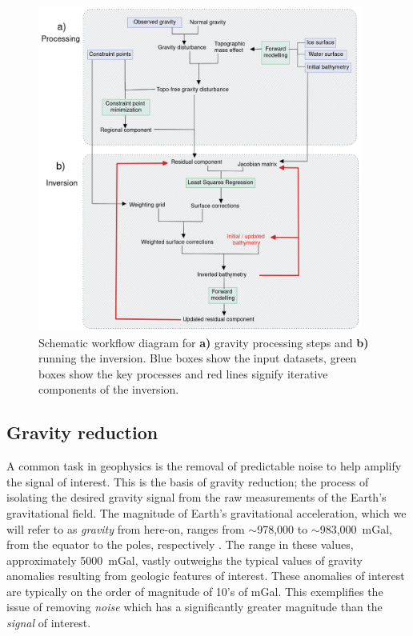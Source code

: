 \begin{figure}[!ht]
    \centering
    \includegraphics[width=0.95\textwidth]{figures/chp4/Inversion_workflow.png}
    \caption[Schematic inversion workflow diagram]{Schematic workflow diagram for \textbf{a)} gravity processing steps and \textbf{b)} running the inversion. Blue boxes show the input datasets, green boxes show the key processes and red lines signify iterative components of the inversion.}
    \label{fig:chp4_workflow}
\end{figure}

\subsection{Gravity reduction} \label{chp4:gravity_reduction}

A common task in geophysics is the removal of predictable noise to help amplify the signal of interest. This is the basis of gravity reduction; the process of isolating the desired gravity signal from the raw measurements of the Earth's gravitational field. The magnitude of Earth's gravitational acceleration, which we will refer to as \textit{gravity} from here-on, ranges from $\sim$978,000 to $\sim$983,000~mGal, from the equator to the poles, respectively \citep{hofmann-wellenhofphysical2006}. The range in these values, approximately 5000~mGal, vastly outweighs the typical values of gravity anomalies resulting from geologic features of interest. These anomalies of interest are typically on the order of magnitude of 10's of mGal. This exemplifies the issue of removing \textit{noise} which has a significantly greater magnitude than the \textit{signal} of interest. \\

